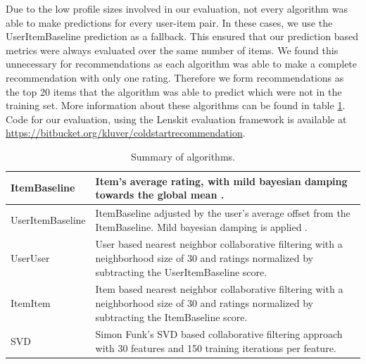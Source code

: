 \documentclass[letterpaper]{sig-alternate}
\begin{document}
  Due to the low profile sizes involved in our evaluation, not every algorithm was able to make predictions for every user-item pair.
  In these cases, we use the UserItemBaseline prediction as a fallback.
  This ensured that our prediction based metrics were always evaluated over the same number of items.
  We found this unnecessary for recommendations as each algorithm was able to make a complete recommendation with only one rating.
  Therefore we form recommendations as the top 20 items that the algorithm was able to predict which were not in the training set.
  More information about these algorithms can be found in table \ref{tbl:algo}.
  Code for our evaluation, using the Lenskit evaluation framework \cite{lenskit} is available at \url{https://bitbucket.org/kluver/coldstartrecommendation}.
  
  \begin{table}[ht!]
    \centering
    \begin{tabular}{|p{6em}|p{18em}|}
      \hline
      ItemBaseline       & Item's average rating, with mild bayesian damping towards the global mean \cite{funk_netflix_2006}. \\\hline
      UserItem\-Baseline & ItemBaseline adjusted by the user's average offset from the ItemBaseline. Mild bayesian damping is applied \cite{funk_netflix_2006}. \\\hline
      UserUser           & User based nearest neighbor collaborative filtering \cite{resnick1994grouplens} with a neighborhood size of 30 and ratings normalized by subtracting the UserItemBaseline score. \\\hline
      ItemItem           & Item based nearest neighbor collaborative filtering \cite{sarwar2001item} with a neighborhood size of 30 and ratings normalized by subtracting the ItemBaseline score.   \\\hline
      SVD                & Simon Funk's SVD based collaborative filtering approach \cite{funk_netflix_2006} with 30 features and 150 training iterations per feature. \\\hline
    \end{tabular}
    \caption{Summary of algorithms.}
    \label{tbl:algo}
  \end{table}
\end{document}
